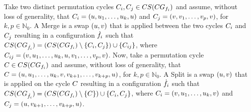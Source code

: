 \documentclass[msc,english,table,xcdraw]{ppgccufmg}
\begin{document}
Take two distinct permutation cycles $C_{i},C_{j} \in CS(CG_{f_{i}})$ and assume, without loss of 
generality, that $C_{i} = (u, u_{1}, \ldots, 
u_{k},u)$ and $C_{j} = (v, v_{1}, \ldots, 
v_{p}, v)$, for $k,p \in  \mathbb{N}_{0}$.
A Merge is a swap $(u, v)$ that is applied between the
two cycles $C_{i}$ and $C_{j}$ resulting in a configuration 
$\dot{f_{i}}$ such that $CS(CG_{\dot{f_{i}}
}) = (CS(CG_{f_{i}}) \setminus \{C_{i}, C_{j}\}) \cup \{C_{ij}\}$, where $C_{ij} = (v,u_{1},\ldots,u_{k}, u, v_{1}, \ldots, 
v_{p}, v)$.
Now, take a permutation cycle $C \in CS(CG_
{f_{i}})$ and assume, without loss of generality, that $C = 
(u,u_{1},\ldots,u_{k}, v, v_{k+1}, 
\ldots, v_{k+p}, u)$, for $k,p \in \mathbb{N}_{0}$.
A Split is a swap $(u, v)$ that is applied on the cycle 
$C$ resulting in a configuration $\dot{f_{i}}$ such that $CS(CG_{\dot{f_{i}}}) = (CS(
CG_{f_{i}}) \setminus \{C\}) \cup \{C_{i}, 
C_{j}\}$, where $C_{i} = (v, u_{1}, \ldots, 
u_{k}, v)$ and $C_{j} = (u, v_{k+1},\ldots,\\ 
v_{k+p},u)$.


\end{document}
